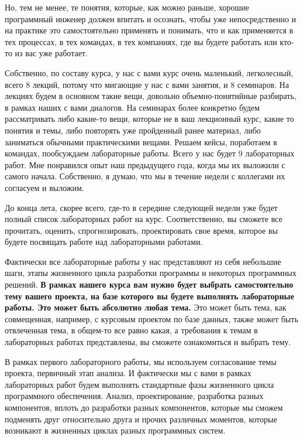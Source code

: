 Но, тем не менее, те понятия, которые, как можно раньше, хорошие программный инженер должен впитать и осознать, чтобы уже непосредственно и на практике это самостоятельно применять и понимать, что и как применяется в тех процессах, в тех командах, в тех компаниях, где вы будете работать или кто-то из вас уже работает.

Собственно, по составу курса, у нас с вами курс очень маленький, легколесный, всего 8 лекций, потому что мигающие у нас с вами занятия, и 8 семинаров. На лекциях будем в основном такие вещи, довольно объемно-понятийные разбирать, в рамках наших с вами диалогов. На семинарах более конкретно будем рассматривать либо какие-то вещи, которые не в ваш лекционный курс, какие то понятия и темы, либо повторять уже пройденный ранее материал, либо заниматься обычными практическими вещами. Решаем кейсы, поработаем в командах, пообсуждаем лабораторные работы. Всего у нас будет 9 лабораторных работ. Мне понравился опыт наш предыдущего года, когда мы их выложили с самого начала. Собственно, я думаю, что мы в течение недели с коллегами их согласуем и выложим.

До конца лета, скорее всего, где-то в середине следующей недели уже будет полный список лабораторных работ на курс. Соответственно, вы сможете все прочитать, оценить, спрогнозировать, проектировать свое время, которое вы будете посвящать работе над лабораторными работами.

Фактически все лабораторные работы у нас представляют из себя небольшие шаги, этапы жизненного цикла разработки программы и некоторых программных решений. \textbf{В рамках нашего курса вам нужно будет выбрать самостоятельно тему вашего проекта, на базе которого вы будете выполнять лабораторные работы. Это может быть абсолютно любая тема.} Это может быть тема, как совмещенная, например, с курсовым проектом по базе данных, также может быть отвлеченная тема, в общем-то все равно какая, а требования к темам в лабораторных работах представлены, вы сможете ознакомиться и выбрать тему.

В рамках первого лабораторного работы, мы используем согласование темы проекта, первичный этап анализа. И фактически мы с вами в рамках лабораторных работ будем выполнять стандартные фазы жизненного цикла программного обеспечения. Анализ, проектирование, разработка разных компонентов, вплоть до разработки разных компонентов, которые мы сможем подменять друг относительно друга и прочих различных моментов, которые возникают в жизненных циклах разных программных систем.

